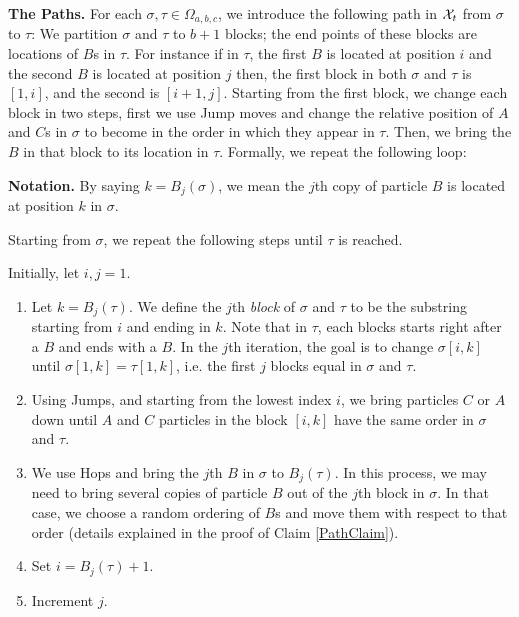 \documentclass[10 pt]{article}
\newcommand{\EX}{{\cal X}}
\begin{document}
\textbf{The Paths.}
For each $\sigma,\tau\in \Omega_{a,b,c}$, we introduce the following path in $\EX_t$ from $\sigma$ to $\tau$: We partition $\sigma$
and $\tau$ to $b+1$ blocks; the end points of these blocks are locations of $B$s in $\tau$. For instance if in $\tau$, the first $B$
is located at position $i$ and the second $B$ is located at position $j$ then, the first block in both $\sigma$ and $\tau$ is $[1,i]$,
and the second is $[i+1,j]$. Starting from the first block, we change each block in two steps, first we use Jump moves and change
the relative position of $A$ and $C$s in $\sigma$ to become in the order in which they appear in $\tau$. Then, we bring the $B$
in that block to its location in $\tau$. Formally, we repeat the following loop:
\medskip

\textbf{Notation.} By saying $k=B_j(\sigma)$, we mean the $j$th copy of particle $B$ is located at position $k$ in $\sigma$. 

\noindent 
Starting from $\sigma$, we repeat the following steps until $\tau$ is reached.

Initially, let $i,j=1$. 
\begin{enumerate}
\item Let $k=B_j(\tau)$. We define the  $j$th \emph{block} of $\sigma$ and $\tau$ to be the substring starting from $i$ and ending in $k$.
Note that in $\tau$, each blocks starts right after a $B$ and ends with a $B$. In the $j$th iteration, the goal is to change
$\sigma[i,k]$ until $\sigma[1,k]=\tau[1,k]$, i.e. the first $j$ blocks equal in $\sigma$ and $\tau$.

\item Using Jumps, and starting from the lowest index $i$, we bring particles $C$ or $A$ down until $A$ and $C$ particles in the block
$[i,k]$ have the same order in $\sigma$ and $\tau$.
\item We use Hops and bring the $j$th $B$ in $\sigma$ to $B_j(\tau)$. In this process, we may need to bring several copies of particle
$B$ out of the $j$th block in $\sigma$. In that case, we choose a random ordering of $B$s and move them with respect to that order
(details explained in the proof of Claim \ref{PathClaim}).
\item Set $i=B_j(\tau)+1$.
\item Increment $j$.
\end{enumerate}
\end{document}

